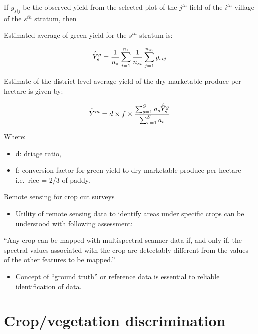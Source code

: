 \documentclass[11pt,dvipsnames,ignorenonframetext,aspectratio=169]{beamer}
\providecommand{\tightlist}{%
  \setlength{\itemsep}{0pt}\setlength{\parskip}{0pt}}
\begin{document}
\begin{frame}{}
\protect\hypertarget{section-2}{}
\small

If \(y_{sij}\) be the observed yield from the selected plot of the
\(j^{th}\) field of the \(i^{th}\) village of the \(s^{th}\) stratum,
then

Estimated average of green yield for the \(s^{th}\) stratum is:

\[
\small
\hat{\bar{Y}}_s^g = \frac{1}{n_s} \sum^{n_{s}}_{i = 1} \frac{1}{n_{si}} \sum^{n_{si}}_{j = 1} y_{sij}
\]

Estimate of the district level average yield of the dry marketable
produce per hectare is given by:

\[
\small
\hat{\bar{Y}}^m = d \times f \times \frac{\sum^S_{s = 1} a_s \hat{\bar{Y}}_s^g}{\sum^S_{s = 1}a_s}
\]

Where:

\begin{itemize}
\tightlist
\item
  d: driage ratio,
\item
  f: conversion factor for green yield to dry marketable produce per
  hectare i.e.~rice = 2/3 of paddy.
\end{itemize}
\end{frame}

\begin{frame}{Remote sensing for crop cut surveys}
\protect\hypertarget{remote-sensing-for-crop-cut-surveys}{}
\begin{itemize}
\tightlist
\item
  Utility of remote sensing data to identify areas under specific crops
  can be understood with following assessment:
\end{itemize}

``Any crop can be mapped with multispectral scanner data if, and only
if, the spectral values associated with the crop are detectably
different from the values of the other features to be mapped.''

\begin{itemize}
\tightlist
\item
  Concept of ``ground truth'' or reference data is essential to reliable
  identification of data.
\end{itemize}
\end{frame}

\hypertarget{cropvegetation-discrimination}{%
\section{Crop/vegetation
discrimination}\label{cropvegetation-discrimination}}
\end{document}
